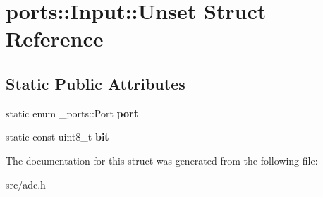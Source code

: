 \hypertarget{structports_1_1Input_1_1Unset}{}\section{ports\+:\+:Input\+:\+:Unset Struct Reference}
\label{structports_1_1Input_1_1Unset}
\subsection*{Static Public Attributes}
\begin{DoxyCompactItemize}
\item 
static enum \+\_\+ports\+::\+Port {\bfseries port}\hypertarget{structports_1_1Input_1_1Unset_a6f9040a0575bc36e160a250b1e5ffd60}{}\label{structports_1_1Input_1_1Unset_a6f9040a0575bc36e160a250b1e5ffd60}

\item 
static const uint8\+\_\+t {\bfseries bit}\hypertarget{structports_1_1Input_1_1Unset_a41a1060aaf73ac383f7652ea334d7418}{}\label{structports_1_1Input_1_1Unset_a41a1060aaf73ac383f7652ea334d7418}

\end{DoxyCompactItemize}


The documentation for this struct was generated from the following file\+:\begin{DoxyCompactItemize}
\item 
src/adc.\+h\end{DoxyCompactItemize}
